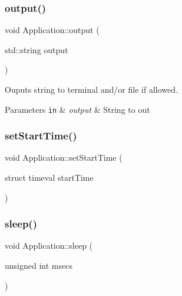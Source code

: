 \subsubsection{\texorpdfstring{output()}{output()}}
{\footnotesize\ttfamily void Application\+::output (\begin{DoxyParamCaption}\item[{std\+::string}]{output }\end{DoxyParamCaption})\hspace{0.3cm}{\ttfamily [private]}}



Ouputs string to terminal and/or file if allowed. 


\begin{DoxyParams}[1]{Parameters}
\mbox{\tt in}  & {\em output} & String to out \\
\hline
\end{DoxyParams}
\hypertarget{class_application_ab8c8aabf4ae8ba4d9b7e87066c43f9b9}{}\label{class_application_ab8c8aabf4ae8ba4d9b7e87066c43f9b9} 
\subsubsection{\texorpdfstring{set\+Start\+Time()}{setStartTime()}}
{\footnotesize\ttfamily void Application\+::set\+Start\+Time (\begin{DoxyParamCaption}\item[{struct timeval}]{start\+Time }\end{DoxyParamCaption})\hspace{0.3cm}{\ttfamily [inline]}}

\hypertarget{class_application_a5e91885cbf2538d31c447e669a83fd4e}{}\label{class_application_a5e91885cbf2538d31c447e669a83fd4e} 
\subsubsection{\texorpdfstring{sleep()}{sleep()}}
{\footnotesize\ttfamily void Application\+::sleep (\begin{DoxyParamCaption}\item[{unsigned int}]{msecs }\end{DoxyParamCaption})\hspace{0.3cm}{\ttfamily [private]}}



